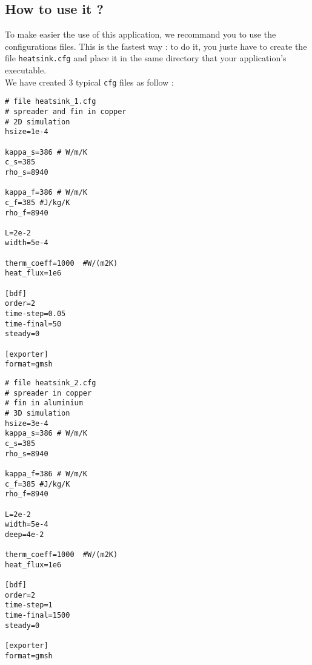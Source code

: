 \subsection{How to use it ?}
To make easier the use of this application, we recommand you to use the configurations files. This is the fastest way : to do it, you juste have to create the file \lstinline!heatsink.cfg! and place it in the same directory that your application's executable. \\
We have created $3$ typical \lstinline!cfg! files as follow :
\begin{lstlisting}
# file heatsink_1.cfg
# spreader and fin in copper
# 2D simulation
hsize=1e-4

kappa_s=386 # W/m/K                                                                                                                                      
c_s=385
rho_s=8940

kappa_f=386 # W/m/K                                                                                                                                      
c_f=385 #J/kg/K                                                                                                                                          
rho_f=8940

L=2e-2
width=5e-4                                                                                                                                               

therm_coeff=1000  #W/(m2K)                                                                                                                               
heat_flux=1e6

[bdf]
order=2
time-step=0.05
time-final=50
steady=0

[exporter]
format=gmsh
\end{lstlisting}

\begin{lstlisting}
# file heatsink_2.cfg
# spreader in copper
# fin in aluminium
# 3D simulation
hsize=3e-4
kappa_s=386 # W/m/K                                                                                                                                      
c_s=385
rho_s=8940

kappa_f=386 # W/m/K                                                                                                                                      
c_f=385 #J/kg/K                                                                                                                                          
rho_f=8940

L=2e-2
width=5e-4
deep=4e-2

therm_coeff=1000  #W/(m2K)                                                                                                                               
heat_flux=1e6

[bdf]
order=2
time-step=1
time-final=1500
steady=0

[exporter]
format=gmsh
\end{lstlisting}

